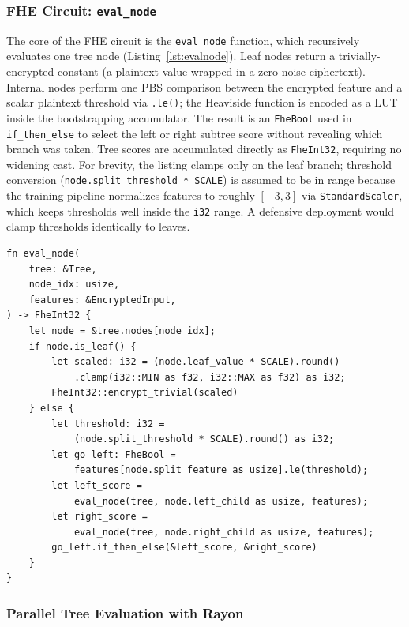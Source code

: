 \documentclass[12pt]{article}
\begin{document}
\subsubsection*{FHE Circuit: \texttt{eval\_node}}

The core of the FHE circuit is the \texttt{eval\_node} function, which recursively evaluates one tree node (Listing~\ref{lst:evalnode}). Leaf nodes return a trivially-encrypted constant (a plaintext value wrapped in a zero-noise ciphertext). Internal nodes perform one PBS comparison between the encrypted feature and a scalar plaintext threshold via \texttt{.le()}; the Heaviside function is encoded as a LUT inside the bootstrapping accumulator. The result is an \texttt{FheBool} used in \texttt{if\_then\_else} to select the left or right subtree score without revealing which branch was taken. Tree scores are accumulated directly as \texttt{FheInt32}, requiring no widening cast. For brevity, the listing clamps only on the leaf branch; threshold conversion (\texttt{node.split\_threshold * SCALE}) is assumed to be in range because the training pipeline normalizes features to roughly $[-3, 3]$ via \texttt{StandardScaler}, which keeps thresholds well inside the \texttt{i32} range. A defensive deployment would clamp thresholds identically to leaves.

\begin{lstlisting}[caption={Recursive FHE tree node evaluation (\texttt{src/eval/fhe/evaluator.rs}). Each internal node triggers one PBS call; both subtrees are always computed for obliviousness.}, label={lst:evalnode}]
fn eval_node(
    tree: &Tree,
    node_idx: usize,
    features: &EncryptedInput,
) -> FheInt32 {
    let node = &tree.nodes[node_idx];
    if node.is_leaf() {
        let scaled: i32 = (node.leaf_value * SCALE).round()
            .clamp(i32::MIN as f32, i32::MAX as f32) as i32;
        FheInt32::encrypt_trivial(scaled)
    } else {
        let threshold: i32 =
            (node.split_threshold * SCALE).round() as i32;
        let go_left: FheBool =
            features[node.split_feature as usize].le(threshold);
        let left_score =
            eval_node(tree, node.left_child as usize, features);
        let right_score =
            eval_node(tree, node.right_child as usize, features);
        go_left.if_then_else(&left_score, &right_score)
    }
}
\end{lstlisting}

\subsubsection*{Parallel Tree Evaluation with Rayon}
\end{document}

